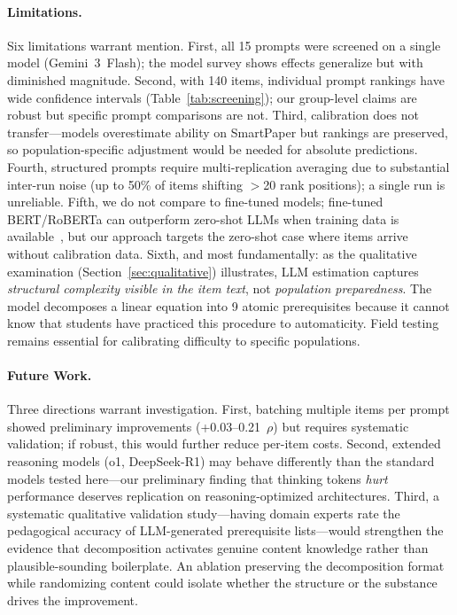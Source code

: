 \documentclass[runningheads]{llncs}
\begin{document}
\paragraph{Limitations.}
Six limitations warrant mention. First, all 15 prompts were screened on a single model (Gemini~3~Flash); the model survey shows effects generalize but with diminished magnitude. Second, with 140 items, individual prompt rankings have wide confidence intervals (Table~\ref{tab:screening}); our group-level claims are robust but specific prompt comparisons are not. Third, calibration does not transfer---models overestimate ability on SmartPaper but rankings are preserved, so population-specific adjustment would be needed for absolute predictions. Fourth, structured prompts require multi-replication averaging due to substantial inter-run noise (up to 50\% of items shifting $>$20 rank positions); a single run is unreliable. Fifth, we do not compare to fine-tuned models; fine-tuned BERT/RoBERTa can outperform zero-shot LLMs when training data is available~\cite{lijiao2025}, but our approach targets the zero-shot case where items arrive without calibration data. Sixth, and most fundamentally: as the qualitative examination (Section~\ref{sec:qualitative}) illustrates, LLM estimation captures \emph{structural complexity visible in the item text}, not \emph{population preparedness}. The model decomposes a linear equation into 9 atomic prerequisites because it cannot know that students have practiced this procedure to automaticity. Field testing remains essential for calibrating difficulty to specific populations.

\paragraph{Future Work.}
Three directions warrant investigation. First, batching multiple items per prompt showed preliminary improvements (+0.03--0.21~$\rho$) but requires systematic validation; if robust, this would further reduce per-item costs. Second, extended reasoning models (o1, DeepSeek-R1) may behave differently than the standard models tested here---our preliminary finding that thinking tokens \emph{hurt} performance deserves replication on reasoning-optimized architectures. Third, a systematic qualitative validation study---having domain experts rate the pedagogical accuracy of LLM-generated prerequisite lists---would strengthen the evidence that decomposition activates genuine content knowledge rather than plausible-sounding boilerplate. An ablation preserving the decomposition format while randomizing content could isolate whether the structure or the substance drives the improvement.
\end{document}
